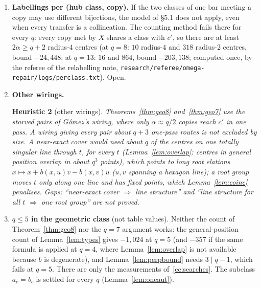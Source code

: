 \documentclass[11pt]{amsart}
\newcommand{\file}[1]{\nolinkurl{#1}}
\theoremstyle{plain}
\newtheorem{heuristic}{Heuristic}
\theoremstyle{definition}
\theoremstyle{remark}
\begin{document}
\begin{enumerate}[leftmargin=1.5em]
  \begin{heuristic}[first moment]\label{h:first}
  If the far pairs of a uniformly random labelling were independent events, the expected number of labellings with
  diameter $8$ would be $\exp(\ln\#\text{labellings} - E[F])$, with $(N!)^{10\alpha - 2}$ labellings up to renaming the
  rows of each bar: about $e^{+3.5\cdot10^3}$ at $q = 2$, $e^{+4.8\cdot10^4}$ at $q = 3$, $e^{-4.1\cdot10^5}$ at $q = 4$,
  $e^{-5.4\cdot10^6}$ at $q = 5$, $e^{-6.4\cdot10^8}$ at $q = 7$. (The table audit used the exponent $10\alpha - 1$; the
  difference, $\ln N!$, changes no sign.) \emph{Gap:} the far pairs are strongly dependent, and
  the estimate says nothing about structured labellings.
  \end{heuristic}

\item \textbf{Labellings per (hub class, copy).} If the two classes of one bar meeting a copy may use different
  bijections, the model of \S5.1 does not apply, even when every transfer is a collineation. The counting method fails
  there for every $q$: every copy met by $X$ shares a class with $c'$, so there are at least $2\alpha \ge q + 2$
  radius-$4$ centres (at $q = 8$: $10$ radius-$4$ and $318$ radius-$2$ centres, bound $-24{,}448$; at $q = 13$: $16$ and
  $864$, bound $-203{,}138$; computed once, by the referee of the relabelling note,
  \file{research/referee/omega-repair/logs/perclass.txt}). Open.

\item \textbf{Other wirings.}
  \begin{heuristic}[other wirings]\label{h:wirings}
  Theorems~\ref{thm:geo8} and~\ref{thm:geo7} use the starved pairs of Gómez's wiring, where only $\alpha \approx q/2$
  copies reach $c'$ in one pass. A wiring giving every pair about $q + 3$ one-pass routes is not excluded by size. A
  near-exact cover would need about $q$ of the centres on one totally singular line through $t$, for every $t$
  (Lemma~\ref{lem:overlap}: centres in general position overlap in about $q^3$ points), which points to long root
  elations $x \mapsto x + b(x,u)v - b(x,v)u$ ($u, v$ spanning a hexagon line); a root group moves $t$ only along one line
  and has fixed points, which Lemma~\ref{lem:coinc} penalises. \emph{Gaps:} ``near-exact cover $\Rightarrow$ line
  structure'' and ``line structure for all $t$ $\Rightarrow$ one root group'' are not proved.
  \end{heuristic}

\item \textbf{$q \le 5$ in the geometric class} (not table values). Neither the count of Theorem~\ref{thm:geo8} nor the
  $q = 7$ argument works: the general-position count of Lemma~\ref{lem:types} gives $-1{,}024$ at $q = 5$ (and $-357$ if
  the same formula is applied at $q = 4$, where Lemma~\ref{lem:overlap} is not available because $b$ is degenerate), and
  Lemma~\ref{lem:perpbound} needs $3 \mid q - 1$, which fails at $q = 5$. There are only the measurements
  of~\ref{cc:searches}. The subclass $a_c = b_c$ is settled for every $q$ (Lemma~\ref{lem:oneaut}).


\end{enumerate}
\end{document}

